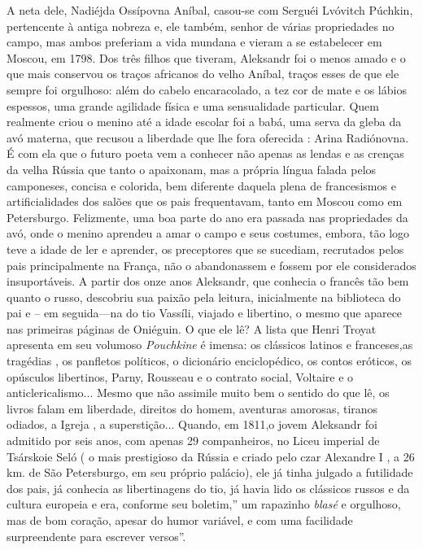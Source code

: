 A neta dele, Nadiéjda Ossípovna Aníbal, casou-se com Serguéi Lvóvitch
Púchkin, pertencente à antiga nobreza e, ele também, senhor de várias
propriedades no campo, mas ambos preferiam a vida mundana e vieram a se
estabelecer em Moscou, em 1798. Dos três filhos que tiveram, Aleksandr
foi o menos amado e o que mais conservou os traços africanos do velho
Aníbal, traços esses de que ele sempre foi orgulhoso: além do cabelo
encaracolado, a tez cor de mate e os lábios espessos, uma grande
agilidade física e uma sensualidade particular. Quem realmente criou o
menino até a idade escolar foi a babá, uma serva da gleba da avó
materna, que recusou a liberdade que lhe fora oferecida : Arina
Radiónovna. É com ela que o futuro poeta vem a conhecer não apenas as
lendas e as crenças da velha Rússia que tanto o apaixonam, mas a própria
língua falada pelos camponeses, concisa e colorida, bem diferente
daquela plena de francesismos e artificialidades dos salões que os pais
frequentavam, tanto em Moscou como em Petersburgo. Felizmente, uma boa
parte do ano era passada nas propriedades da avó, onde o menino aprendeu
a amar o campo e seus costumes, embora, tão logo teve a idade de ler e
aprender, os preceptores que se sucediam, recrutados pelos pais
principalmente na França, não o abandonassem e fossem por ele
considerados insuportáveis. A partir dos onze anos Aleksandr, que
conhecia o francês tão bem quanto o russo, descobriu sua paixão pela
leitura, inicialmente na biblioteca do pai e -- em seguida---na do tio
Vassíli, viajado e libertino, o mesmo que aparece nas primeiras páginas
de Oniéguin. O que ele lê? A lista que Henri Troyat apresenta em seu
volumoso \emph{Pouchkine} é imensa: os clássicos latinos e franceses,as
tragédias , os panfletos políticos, o dicionário enciclopédico, os
contos eróticos, os opúsculos libertinos, Parny, Rousseau e o contrato
social, Voltaire e o anticlericalismo... Mesmo que não assimile muito
bem o sentido do que lê, os livros falam em liberdade, direitos do
homem, aventuras amorosas, tiranos odiados, a Igreja , a superstição...
Quando, em 1811,o jovem Aleksandr foi admitido por seis anos, com apenas
29 companheiros, no Liceu imperial de Tsárskoie Seló ( o mais
prestigioso da Rússia e criado pelo czar Alexandre I , a 26 km. de São
Petersburgo, em seu próprio palácio), ele já tinha julgado a futilidade
dos pais, já conhecia as libertinagens do tio, já havia lido os
clássicos russos e da cultura europeia e era, conforme seu boletim,'' um
rapazinho \emph{blasé} e orgulhoso, mas de bom coração, apesar do humor
variável, e com uma facilidade surpreendente para escrever versos''.
